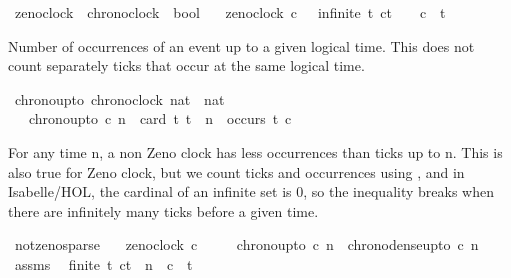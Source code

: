 \begin{isabellebody}
\isamarkupfalse%
\ zeno{\isacharunderscore}clock\ {\isacharcolon}{\isacharcolon}\ {\isacartoucheopen}chronoclock\ {\isasymRightarrow}\ bool{\isacartoucheclose}\isanewline
\ \ \ {\isacartoucheopen}zeno{\isacharunderscore}clock\ c\ {\isasymequiv}\ {\isacharparenleft}{\isasymexists}{\isasymomega}{\isachardot}\ infinite\ {\isacharbraceleft}t{\isachardot}\ c\isactrlbsub t\isactrlesub \ {\isasymle}\ {\isasymomega}\ {\isasymand}\ c\ {\isasymnabla}\ t{\isacharbraceright}{\isacharparenright}{\isacartoucheclose}%
\begin{isamarkuptext}%
Number of occurrences of an event up to a given logical time.
This does not count separately ticks that occur at the same logical time.%
\end{isamarkuptext}\isamarkuptrue%
\isamarkupfalse%
\ chrono{\isacharunderscore}up{\isacharunderscore}to\ {\isacharcolon}{\isacharcolon}{\isacartoucheopen}{\isacharbrackleft}chronoclock{\isacharcomma}\ nat{\isacharbrackright}\ {\isasymRightarrow}\ nat{\isacartoucheclose}\isanewline
\ \ \ {\isacartoucheopen}chrono{\isacharunderscore}up{\isacharunderscore}to\ c\ n\ {\isacharequal}\ card\ {\isacharbraceleft}t{\isachardot}\ t\ {\isasymle}\ n\ {\isasymand}\ occurs\ t\ c{\isacharbraceright}{\isacartoucheclose}%
\begin{isamarkuptext}%
For any time n, a non Zeno clock has less occurrences than ticks up to n.
This is also true for Zeno clock, but we count ticks and occurrences using ,
and in Isabelle/HOL, the cardinal of an infinite set is 0, so the inequality breaks when
there are infinitely many ticks before a given time.%
\end{isamarkuptext}\isamarkuptrue%
\isamarkupfalse%
\ not{\isacharunderscore}zeno{\isacharunderscore}sparse{\isacharcolon}\isanewline
\ \ \ {\isacartoucheopen}{\isasymnot}zeno{\isacharunderscore}clock\ c{\isacartoucheclose}\isanewline
\ \ \ \ \ {\isacartoucheopen}chrono{\isacharunderscore}up{\isacharunderscore}to\ c\ n\ {\isasymle}\ chrono{\isacharunderscore}dense{\isacharunderscore}up{\isacharunderscore}to\ c\ n{\isacartoucheclose}\isanewline
%
\isadelimproof
%
\endisadelimproof
%
\isatagproof
{}\isamarkupfalse%
\ {\isacharminus}\isanewline
\ \ \isamarkupfalse%
\ assms\ \isamarkupfalse%
\ {\isacartoucheopen}finite\ {\isacharbraceleft}t{\isachardot}\ c\isactrlbsub t\isactrlesub \ {\isasymle}\ n\ {\isasymand}\ c\ {\isasymnabla}\ t{\isacharbraceright}{\isacartoucheclose}\isanewline

\end{isabellebody}
